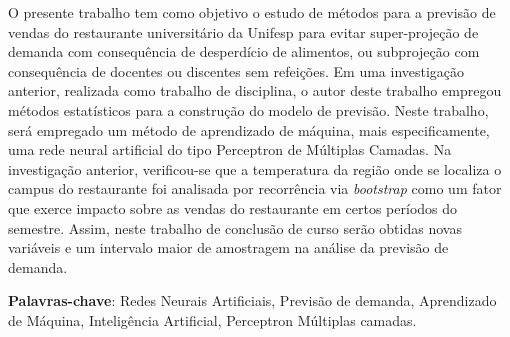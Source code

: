 \documentclass[	12pt, Times, openright, twoside, a4paper, english, brazil]{abntex2}
\begin{document}
    \begin{resumo}
         O presente trabalho tem como objetivo o estudo de métodos para a previsão de vendas do restaurante universitário da Unifesp para evitar super-projeção de demanda com consequência de desperdício de alimentos, ou subprojeção com consequência de docentes ou discentes sem refeições.
         Em uma investigação anterior, realizada como trabalho de disciplina, o autor deste trabalho empregou métodos estatísticos para a construção do modelo de previsão. Neste trabalho, será empregado um método de aprendizado de máquina, mais especificamente, uma rede neural artificial do tipo Perceptron de Múltiplas Camadas. Na investigação anterior, verificou-se que a temperatura da região onde se localiza o campus do restaurante foi analisada por recorrência via \textit{bootstrap} como um fator que exerce impacto sobre as vendas do restaurante em certos períodos do semestre. Assim,  neste trabalho de conclusão de curso serão obtidas novas variáveis e um intervalo maior de amostragem na análise da previsão de demanda.
 
     
     \vspace{\onelineskip}
        
     \noindent
     \textbf{Palavras-chave}: Redes Neurais Artificiais, Previsão de demanda, Aprendizado de Máquina, Inteligência Artificial, Perceptron Múltiplas camadas. 
     
    \end{resumo}
\end{document}
